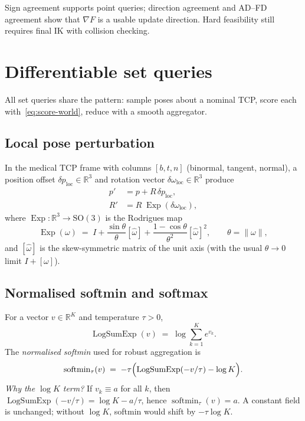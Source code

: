 \documentclass[11pt,a4paper]{article}
\newcommand{\SO}{\mathrm{SO}}
\newcommand{\R}{\mathbb{R}}
\newcommand{\softmin}{\operatorname{softmin}}
\newcommand{\LogSumExp}{\operatorname{LogSumExp}}
\begin{document}
Sign agreement supports point queries; direction agreement and AD--FD
agreement show that \(\nabla F\) is a usable update direction. Hard
feasibility still requires final IK with collision checking.

\section{Differentiable set queries}
\label{sec:region}

All set queries share the pattern: sample poses about a nominal TCP, score
each with~\eqref{eq:score-world}, reduce with a smooth aggregator.

\subsection{Local pose perturbation}
\label{sec:perturb}

In the medical TCP frame with columns \([b,t,n]\) (binormal, tangent, normal),
a position offset \(\delta p_{\mathrm{loc}}\in\R^{3}\) and rotation vector
\(\delta\omega_{\mathrm{loc}}\in\R^{3}\) produce
\begin{equation}
\label{eq:perturb}
\begin{aligned}
  p'
  &=
  p + R\,\delta p_{\mathrm{loc}},
  \\
  R'
  &=
  R\;\operatorname{Exp}(\delta\omega_{\mathrm{loc}}),
\end{aligned}
\end{equation}
where \(\operatorname{Exp}:\R^{3}\to\SO(3)\) is the Rodrigues map
\begin{equation}
\label{eq:rodrigues}
  \operatorname{Exp}(\omega)
  \;=\;
  I
  +
  \frac{\sin\theta}{\theta}[\hat\omega]
  +
  \frac{1-\cos\theta}{\theta^{2}}[\hat\omega]^{2},
  \qquad
  \theta=\|\omega\|,
\end{equation}
and \([\hat\omega]\) is the skew-symmetric matrix of the unit axis
(with the usual \(\theta\to 0\) limit \(I+[\omega]\)).

\subsection{Normalised softmin and softmax}
\label{sec:soft}

For a vector \(v\in\R^{K}\) and temperature \(\tau>0\),
\begin{equation}
\label{eq:logsumexp}
  \LogSumExp(v)
  \;=\;
  \log\sum_{k=1}^{K} e^{v_{k}}.
\end{equation}
The \emph{normalised softmin} used for robust aggregation is
\begin{equation}
\label{eq:softmin}
  \softmin_{\tau}(v)
  \;=\;
  -\tau\Bigl(
    \LogSumExp(-v/\tau)
    -
    \log K
  \Bigr).
\end{equation}
\emph{Why the \(\log K\) term?}
If \(v_{k}\equiv a\) for all \(k\), then
\(\LogSumExp(-v/\tau)=\log K - a/\tau\), hence
\(\softmin_{\tau}(v)=a\). A constant field is unchanged; without
\(\log K\), softmin would shift by \(-\tau\log K\).
\end{document}
